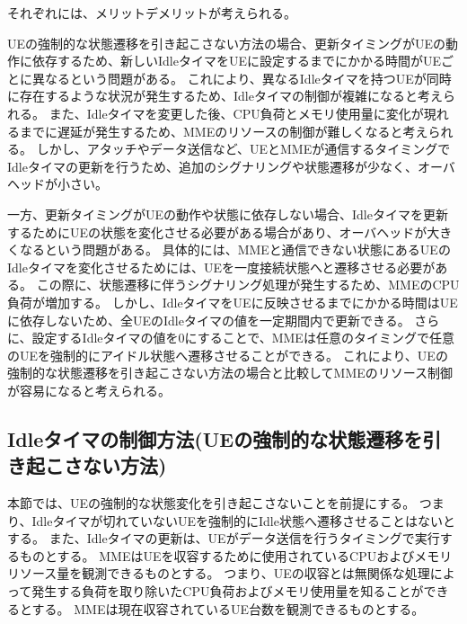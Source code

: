\documentclass[a4j]{ujarticle}
\begin{document}
それぞれには、メリットデメリットが考えられる。

UEの強制的な状態遷移を引き起こさない方法の場合、更新タイミングがUEの動作に依存するため、新しいIdleタイマをUEに設定するまでにかかる時間がUEごとに異なるという問題がある。
これにより、異なるIdleタイマを持つUEが同時に存在するような状況が発生するため、Idleタイマの制御が複雑になると考えられる。
また、Idleタイマを変更した後、CPU負荷とメモリ使用量に変化が現れるまでに遅延が発生するため、MMEのリソースの制御が難しくなると考えられる。
しかし、アタッチやデータ送信など、UEとMMEが通信するタイミングでIdleタイマの更新を行うため、追加のシグナリングや状態遷移が少なく、オーバヘッドが小さい。

一方、更新タイミングがUEの動作や状態に依存しない場合、Idleタイマを更新するためにUEの状態を変化させる必要がある場合があり、オーバヘッドが大きくなるという問題がある。
具体的には、MMEと通信できない状態にあるUEのIdleタイマを変化させるためには、UEを一度接続状態へと遷移させる必要がある。
この際に、状態遷移に伴うシグナリング処理が発生するため、MMEのCPU負荷が増加する。
しかし、IdleタイマをUEに反映させるまでにかかる時間はUEに依存しないため、全UEのIdleタイマの値を一定期間内で更新できる。
さらに、設定するIdleタイマの値を0にすることで、MMEは任意のタイミングで任意のUEを強制的にアイドル状態へ遷移させることができる。
これにより、UEの強制的な状態遷移を引き起こさない方法の場合と比較してMMEのリソース制御が容易になると考えられる。



\subsection{Idleタイマの制御方法(UEの強制的な状態遷移を引き起こさない方法)}
\label{sec:hard-state}
本節では、UEの強制的な状態変化を引き起こさないことを前提にする。
つまり、Idleタイマが切れていないUEを強制的にIdle状態へ遷移させることはないとする。
また、Idleタイマの更新は、UEがデータ送信を行うタイミングで実行するものとする。
MMEはUEを収容するために使用されているCPUおよびメモリリソース量を観測できるものとする。
つまり、UEの収容とは無関係な処理によって発生する負荷を取り除いたCPU負荷およびメモリ使用量を知ることができるとする。
MMEは現在収容されているUE台数を観測できるものとする。
\end{document}
